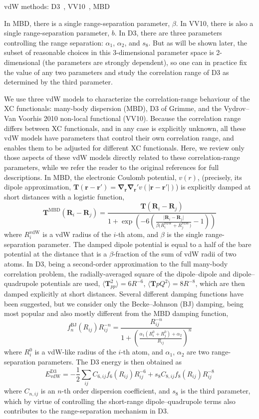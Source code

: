 vdW methods: D3~\cite{GrimmeJCP10}, VV10~\cite{VydrovJCP10a}, MBD

In MBD, there is a single range-separation parameter, $\beta$.
In VV10, there is also a single range-separation parameter, $b$.
In D3, there are three parameters controlling the range separation: $\alpha_1$, $\alpha_2$, and $s_8$.
But as will be shown later, the subset of reasonable choices in this 3-dimensional parameter space is 2-dimensional (the parameters are strongly dependent), so one can in practice fix the value of any two parameters and study the correlation range of D3 as determined by the third parameter.

We use three vdW models to characterize the correlation-range behaviour of the XC functionals: many-body dispersion (MBD), D3 of Grimme, and the Vydrov--Van Voorhis 2010 non-local functional (VV10).
Because the correlation range differs between XC functionals, and in any case is explicitly unknown, all these vdW models have parameters that control their own correlation range, and enables them to be adjusted for different XC functionals.
Here, we review only those aspects of these vdW models directly related to these correlation-range parameters, while we refer the reader to the original references for full descriptions.
In MBD, the electronic Coulomb potential, $v(r)$, (precisely, its dipole approximation, $\mathbf T(\mathbf r-\mathbf r')=\boldsymbol\nabla_\mathbf r\boldsymbol\nabla_\mathbf r'v(\lvert\mathbf r-\mathbf r'\rvert)$) is explicitly damped at short distances with a logistic function,
$$
  \mathbf T^\text{MBD}(\mathbf R_i-\mathbf R_j)=\frac{\mathbf T(\mathbf R_i-\mathbf R_j)}{1+\exp\left(-6\left(\frac{\lvert\mathbf R_i-\mathbf R_j\rvert}{\beta\big(R_i^\text{vdW}+R_j^\text{vdW}\big )}-1\right)\!\!\right)}
$$
where $R_i^\text{vdW}$ is a vdW radius of the $i$-th atom, and $\beta$ is the single range-separation parameter.
The damped dipole potential is equal to a half of the bare potential at the distance that is a $\beta$-fraction of the sum of vdW radii of two atoms.
In D3, being a second-order approximation to the full many-body correlation problem, the radially-averaged square of the dipole--dipole and dipole--quadrupole potentials are used, $\langle\mathbf T_{pp}^2\rangle=6R^{-6}$, $\langle\mathbf T{pQ}^2\rangle=8R^{-8}$, which are then damped explicitly at short distances.
Several different damping functions have been suggested, but we consider only the Becke--Johnson (BJ) damping, being most popular and also mostly different from the MBD damping function,
$$
  f_n^\text{BJ}(R_{ij})R_{ij}^{-n}=\frac{R_{ij}^{-n}}{1+\left(\frac{\alpha_1(R^0_i+R^0_j)+\alpha_2}{R_{ij}}\right)^n}
$$
where $R^0_i$ is a vdW-like radius of the $i$-th atom, and $\alpha_1$, $\alpha_2$ are two range-separation parameters.
The D3 energy is then obtained as
$$
E^\text{D3}_\text{vdW}=-\frac12\sum_{ij}C_{6,ij}f_6(R_{ij})R_{ij}^{-6}+s_8C_{8,ij}f_8(R_{ij})R_{ij}^{-8}
$$
where $C_{n,ij}$ is an $n$-th order dispersion coefficient, and $s_8$ is the third parameter, which by virtue of controlling the short-range dipole--quadrupole terms also contributes to the range-separation mechanism in D3.

